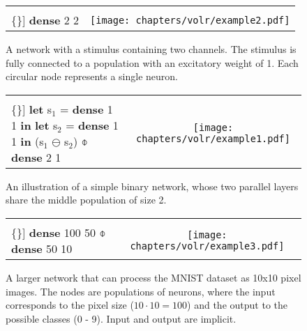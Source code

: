 
\begin{figure}
  \ContinuedFloat*
  \begin{tabular}[t]{l c}
    \begin{minipage}{0.4\textwidth}
      \begin{Verbatim}[mathescape,commandchars=\\\{\}]
\textbf{dense} 2 2
      \end{Verbatim}
    \end{minipage} & \begin{minipage}{0.4\textwidth}
      \texttt{[image: chapters/volr/example2.pdf]}
    \end{minipage}

  \end{tabular}
  \caption{A network with a stimulus containing two channels.
    The stimulus is fully connected to a population with an excitatory
    weight of 1. Each circular node represents a single neuron.}
  \label{fig:volr-example1}
\end{figure}

\begin{figure}
  \ContinuedFloat
  \begin{tabular}[t]{l c}
    \begin{minipage}{0.4\textwidth}
      \begin{Verbatim}[mathescape,commandchars=\\\{\}]
\textbf{let} s$_1$ = \textbf{dense} 1 1 \textbf{in}
\textbf{let} s$_2$ = \textbf{dense} 1 1 \textbf{in}
(s$_1$ $\ominus$ s$_2$) $\obar$ \textbf{dense} 2 1
      \end{Verbatim}
    \end{minipage} & \begin{minipage}{0.6\textwidth}
      \texttt{[image: chapters/volr/example1.pdf]}
    \end{minipage}
  \end{tabular}
  \caption{An illustration of a simple binary network, whose two 
	   parallel layers share the middle population of size 2.}
\end{figure}

\begin{figure}
  \ContinuedFloat
  \begin{tabular}[t]{l c}
    \begin{minipage}[b]{0.4\textwidth}
      \begin{Verbatim}[mathescape,commandchars=\\\{\}]
      \textbf{dense} 100 50
        $\obar$ \textbf{dense} 50 10
      \end{Verbatim}
    \end{minipage} & \begin{minipage}{0.5\textwidth}
      \texttt{[image: chapters/volr/example3.pdf]}
    \end{minipage}
  \end{tabular}
  \caption{A larger network that can process the MNIST dataset
    as 10x10 pixel images. 
    The nodes are populations of neurons,
    where the input corresponds to the pixel size ($10\cdot10=100$) 
    and the output to the possible classes (0 - 9).
    Input and output are implicit.}
\end{figure}


